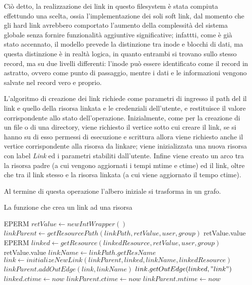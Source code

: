 Ciò detto, la realizzazione dei link in questo filesystem è stata compiuta effettundo una scelta, ossia l'implementazione dei soli soft link, dal momento che gli hard link avrebbero comportato l'aumento della complessità del sistema globale senza fornire funzionalità aggiuntive significative; infattti, come è già stato accennato, il modello prevede la distinzione tra inode e blocchi di dati, ma questa distinzione è in realtà logica, in quanto entrambi si trovano sullo stesso record, ma su due livelli differenti: l'inode può essere identificato come il record in astratto, ovvero come punto di passaggio, mentre i dati e le informazioni vengono salvate nel record vero e proprio.

L'algoritmo di creazione dei link richiede come parametri di ingresso il path del il link e quello della risorsa linkata e le credenziali dell'utente, e restituisce il valore corrispondente allo stato dell'operazione. Inizialmente, come per la creazione di un file o di una directory, viene richiesto il vertice sotto cui creare il link, se si hanno su di esso permessi di esecuzione e scrittura allora viene richiesto anche il vertice corrispondente alla risorsa da linkare; viene inizializzata una nuova risorsa con label \emph{Link} ed i parametri stabiliti dall'utente. Infine viene creato un arco tra la risorsa padre (a cui vengono aggiornati i tempi mtime e ctime) ed il link, oltre che tra il link stesso e la risorsa linkata (a cui viene aggiornato il tempo ctime). 

Al termine di questa operazione l'albero iniziale si trasforma in un grafo.

\begin{algorithm}
\begin{algorithmic}[5]
\caption{La funzione che crea un link ad una risorsa}
		\State \Return EPERM
	\EndIf
	\State $retValue \gets new IntWrapper()$
	\State $linkParent \gets getResourcePath(linkPath, retValue, user, group)$
		\State \Return retValue.value
	\EndIf
		\State \Return EPERM
	\EndIf
	\State $linked \gets getResource(linkedResource, retValue, user, group)$
		\State \Return retValue.value
	\EndIf
	\State $linkName \gets linkPath.getResName$
	\State $link \gets initializeNewLink(linkParent, linked, linkName, linkedResource)$
	\State $linkParent.addOutEdge(link, linkName)$
	\State $link.getOutEdge(linked, "link")$
	\State $linked.ctime \gets now$
	\State $linkParent.ctime \gets now$
	\State $linkParent.mtime \gets now$
	\State {}
\EndFunction
\end{algorithmic}
\end{algorithm}

